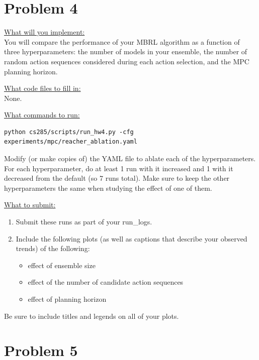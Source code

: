\documentclass{article} %
\begin{document}
\newpage
\section*{Problem 4}

\underline{What will you implement:}\\ 
You will compare the performance of your MBRL algorithm as a function of three hyperparameters: the number of models in your ensemble, the number of random action sequences considered during each action selection, and the MPC planning horizon.

\underline{What code files to fill in:}\\
None.

\underline{What commands to run:}\\
\begin{lstlisting}[escapechar=@]
python cs285/scripts/run_hw4.py -cfg experiments/mpc/reacher_ablation.yaml
\end{lstlisting}

Modify (or make copies of) the YAML file to ablate each of the hyperparameters. For each hyperparameter, do at least 1 run with it increased and 1 with it decreased from the default (so 7 runs total). Make sure to keep the other hyperparameters the same when studying the effect of one of them.

\underline{What to submit:}
\begin{enumerate}
    \item Submit these runs as part of your run\_logs.
    \item Include the following plots (as well as captions that describe your observed trends) of the following:
\begin{itemize}
    \item effect of ensemble size
    \item effect of the number of candidate action sequences
    \item effect of planning horizon
\end{itemize}
\end{enumerate}

Be sure to include titles and legends on all of your plots. \\


\newpage
\section*{Problem 5}
\end{document}
